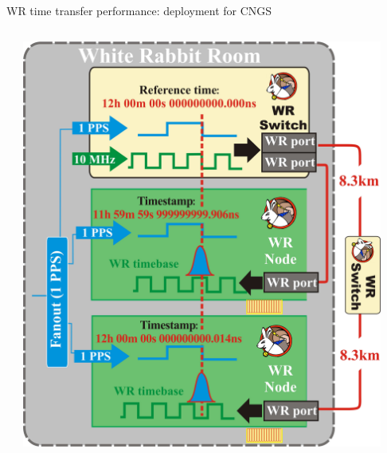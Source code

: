 \documentclass[compress,red]{beamer}
\begin{document}
\begin{frame}{WR time transfer performance: deployment for CNGS}
\begin{columns}[c]
\begin{center}
	  \end{center}
		\begin{center}
		\includegraphics[width=0.93\textwidth]{../../figures/measurements/performance_testing_setup-detail_v2.pdf}
		\end{center}
  \end{columns}
\end{frame}




\end{document}
